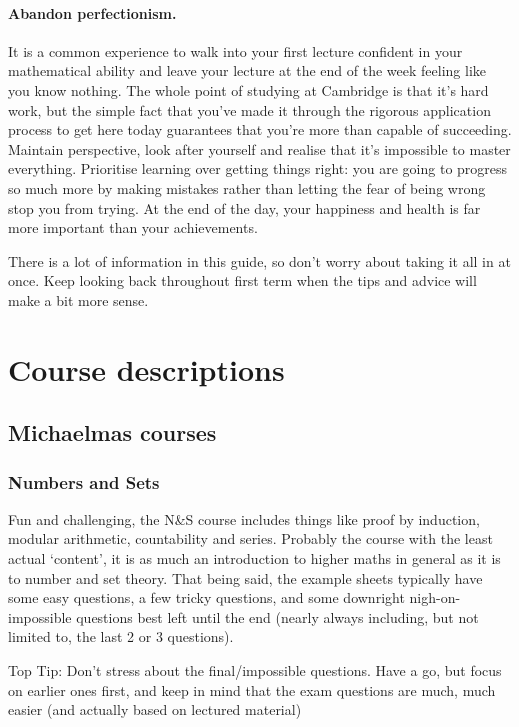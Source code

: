 \documentclass[a4paper,11pt]{article}
\begin{document}
\paragraph{Abandon perfectionism.} It is a common experience to walk into your first lecture confident in your mathematical ability and leave your lecture at the end of the week feeling like you know nothing.  The whole point of studying at Cambridge is that it's hard work, but the simple fact that you've made it through the rigorous application process to get here today guarantees that you're more than capable of succeeding. Maintain perspective, look after yourself and realise that it's impossible to master everything. Prioritise learning over getting things right: you are going to progress so much more by making mistakes rather than letting the fear of being wrong stop you from trying.
At the end of the day, your happiness and health is far more important than your achievements.

There is a lot of information in this guide, so don't worry about taking it all in at once. Keep looking back throughout first term when the tips and advice will make a bit more sense.

\section{Course descriptions}

\subsection{Michaelmas courses}

\subsubsection{Numbers and Sets}
		 
Fun and challenging, the N\&S course includes things like proof by induction, modular arithmetic, countability and series. Probably the course with the least actual `content', it is as much an introduction to higher maths in general as it is to number and set theory. That being said, the example sheets typically have some easy questions, a few tricky questions, and some downright nigh-on-impossible questions best left until the end (nearly always including, but not limited to, the last 2 or 3 questions).

Top Tip: Don't stress about the final/impossible questions. Have a go, but focus on earlier ones first, and keep in mind that the exam questions are much, much easier (and actually based on lectured material)
\end{document}

